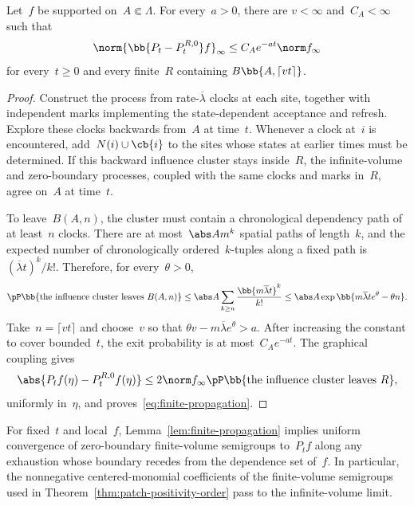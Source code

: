 \begin{lemma}
\label{lem:finite-propagation}
Let~$f$ be supported on~$A\Subset\Lambda$. For every~$a>0$, there are
$v<\infty$ and~$C_A<\infty$ such that
\begin{equation}
\label{eq:finite-propagation}
\norm{\bb{P_t-P_t^{R,0}}f}_\infty
\leq
C_Ae^{-at}\norm f_\infty
\end{equation}
for every~$t\geq0$ and every finite~$R$ containing
$B\bb{A,\lceil vt\rceil}$.
\end{lemma}

\begin{proof}
Construct the process from rate-$\overline\lambda$ clocks at each site,
together with independent marks implementing the state-dependent acceptance
and refresh. Explore these clocks backwards from~$A$ at time~$t$. Whenever a
clock at~$i$ is encountered, add~$N(i)\cup\cb{i}$ to the sites whose states at
earlier times must be determined. If this backward influence cluster stays
inside~$R$, the infinite-volume and zero-boundary processes, coupled with the
same clocks and marks in~$R$, agree on~$A$ at time~$t$.

To leave~$B(A,n)$, the cluster must contain a chronological dependency path of
at least~$n$ clocks. There are at most~$\abs A m^k$ spatial paths of length~$k$,
and the expected number of chronologically ordered~$k$-tuples along a fixed
path is~$(\overline\lambda t)^k/k!$. Therefore, for every~$\theta>0$,
\begin{equation*}
\pP\bb{\text{the influence cluster leaves }B(A,n)}
\leq
\abs A\sum_{k\geq n}\frac{\bb{m\overline\lambda t}^k}{k!}
\leq
\abs A\exp\bb{m\overline\lambda t e^\theta-\theta n}.
\end{equation*}
Take~$n=\lceil vt\rceil$ and choose~$v$ so that
$\theta v-m\overline\lambda e^\theta>a$. After increasing the constant to cover
bounded~$t$, the exit probability is at most~$C_Ae^{-at}$. The graphical
coupling gives
\begin{equation*}
\abs{P_tf(\eta)-P_t^{R,0}f(\eta)}
\leq
2\norm f_\infty
\pP\bb{\text{the influence cluster leaves }R},
\end{equation*}
uniformly in~$\eta$, and proves~\eqref{eq:finite-propagation}.
\end{proof}

For fixed~$t$ and local~$f$, Lemma~\ref{lem:finite-propagation} implies uniform
convergence of zero-boundary finite-volume semigroups to~$P_tf$ along any
exhaustion whose boundary recedes from the dependence set of~$f$. In
particular, the nonnegative centered-monomial coefficients of the finite-volume
semigroups used in Theorem~\ref{thm:patch-positivity-order} pass to the
infinite-volume limit.

